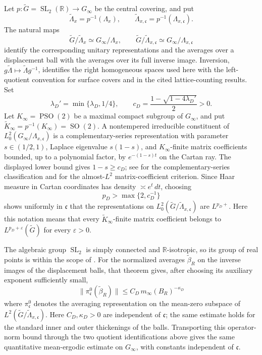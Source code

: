 \documentclass[11pt,reqno]{amsart}
\theoremstyle{definition}
\theoremstyle{remark}
\newcommand{\R}{\mathbb R}
\newcommand{\SL}{\operatorname{SL}}
\begin{document}
Let \(p:\widetilde G=\SL_2(\R)\to G_\infty\) be the central covering, and
put
\[
 \widetilde\Lambda_x=p^{-1}(\Lambda_x),\qquad
 \widetilde\Lambda_{x,\mathfrak c}
     =p^{-1}(\Lambda_{x,\mathfrak c}).
\]
The natural maps
\[
 \widetilde G/\widetilde\Lambda_x\simeq G_\infty/\Lambda_x,
 \qquad
 \widetilde G/\widetilde\Lambda_{x,\mathfrak c}
       \simeq G_\infty/\Lambda_{x,\mathfrak c}
\]
identify the corresponding unitary representations and the averages over a
displacement ball with the averages over its full inverse image.  Inversion,
\(g\widetilde\Lambda\mapsto\widetilde\Lambda g^{-1}\), identifies the
right homogeneous spaces used here with the left-quotient convention for
surface covers and in the cited lattice-counting results.  Set
\[
 \lambda_D'=\min\{\lambda_D,1/4\},\qquad
 c_D=\frac{1-\sqrt{1-4\lambda_D'}}2>0.
\]
Let \(K_\infty=\operatorname{PSO}(2)\) be a maximal compact subgroup of
\(G_\infty\), and put
\(\widetilde K_\infty=p^{-1}(K_\infty)=\operatorname{SO}(2)\).
A nontempered irreducible constituent of
\(L^2_0(G_\infty/\Lambda_{x,\mathfrak c})\) is a complementary-series
representation with parameter \(s\in(1/2,1)\), Laplace eigenvalue
\(s(1-s)\), and \(K_\infty\)-finite matrix coefficients bounded, up to a
polynomial factor, by \(e^{-(1-s)t}\) on the Cartan ray.  The displayed
lower bound gives \(1-s\ge c_D\); see \cite{LangSL2} for the
complementary-series classification and \cite{CowlingHaagerupHowe} for the
almost-\(L^2\) matrix-coefficient criterion.  Since Haar measure in Cartan coordinates
has density \(\asymp e^t\,dt\), choosing
\[
 p_D>\max\{2,c_D^{-1}\}
\]
shows uniformly in \(\mathfrak c\) that the representations on
\(L^2_0(\widetilde G/\widetilde\Lambda_{x,\mathfrak c})\) are
\(L^{p_D+}\).  Here this notation means that every
\(\widetilde K_\infty\)-finite matrix coefficient belongs to
\(L^{p_D+\varepsilon}(\widetilde G)\) for every \(\varepsilon>0\).

The algebraic group \(\SL_2\) is simply connected and \(\R\)-isotropic,
so its group of real points is within the scope of
\cite[Theorem~4.5]{GorodnikNevoCounting}.  For the normalized averages
\(\widetilde\beta_R\) on the inverse images of the displacement balls, that
theorem gives, after choosing its auxiliary exponent sufficiently small,
\[
 \bigl\|\pi^0_{\mathfrak c}(\widetilde\beta_R)\bigr\|
 \le C_D\,m_\infty(B_R)^{-\kappa_D}
\]
where \(\pi^0_{\mathfrak c}\) denotes the averaging representation on the
mean-zero subspace of
\(L^2(\widetilde G/\widetilde\Lambda_{x,\mathfrak c})\).
Here \(C_D,\kappa_D>0\) are independent of \(\mathfrak c\); the same estimate
holds for the standard inner and outer thickenings of the balls.
Transporting this operator-norm bound through the two quotient
identifications above gives the same quantitative mean-ergodic estimate on
\(G_\infty\), with constants independent of \(\mathfrak c\).
\end{document}
